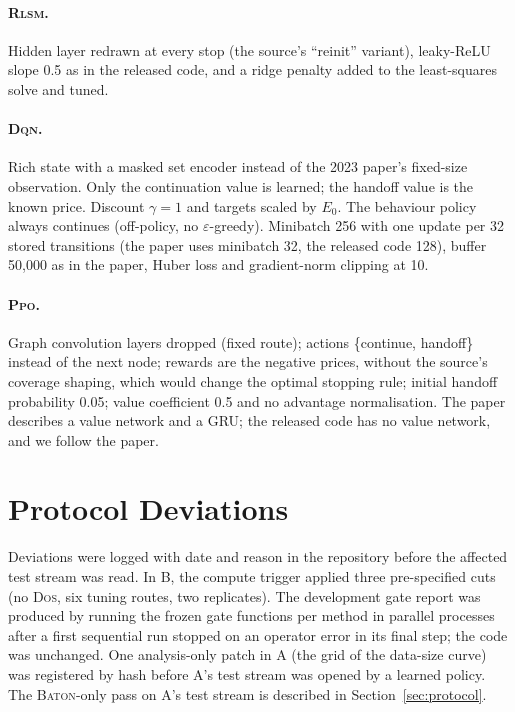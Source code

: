 \documentclass[trsc,dblanonrev]{informs4}
\newcommand{\Baton}{\textsc{Baton}}
\newcommand{\Rlsm}{\textsc{Rlsm}}
\newcommand{\Dqn}{\textsc{Dqn}}
\newcommand{\Ppo}{\textsc{Ppo}}
\newcommand{\Dos}{\textsc{Dos}}
\begin{document}
\begin{APPENDICES}
\paragraph{\Rlsm{}.} Hidden layer redrawn at every stop (the source's
``reinit'' variant), leaky-ReLU slope 0.5 as in the released code, and a ridge
penalty added to the least-squares solve and tuned.

\paragraph{\Dqn{}.} Rich state with a masked set encoder instead of the 2023
paper's fixed-size observation. Only the continuation value is learned; the
handoff value is the known price. Discount $\gamma = 1$ and targets scaled by
$E_0$. The behaviour policy always continues (off-policy, no
$\varepsilon$-greedy). Minibatch 256 with one update per 32 stored
transitions (the paper uses minibatch 32, the released code 128), buffer
50{,}000 as in the paper, Huber loss and gradient-norm clipping at 10.

\paragraph{\Ppo{}.} Graph convolution layers dropped (fixed route); actions
\{continue, handoff\} instead of the next node; rewards are the negative
prices, without the source's coverage shaping, which would change the optimal
stopping rule; initial handoff probability 0.05; value coefficient 0.5 and no
advantage normalisation. The paper describes a value network and a GRU; the
released code has no value network, and we follow the paper.

\section{Protocol Deviations}\label{app:dev}

Deviations were logged with date and reason in the repository before the
affected test stream was read. In B, the compute trigger applied three
pre-specified cuts (no \Dos{}, six tuning routes, two replicates). The
development gate report was produced by running the frozen gate functions per
method in parallel processes after a first sequential run stopped on an
operator error in its final step; the code was unchanged. One analysis-only
patch in A (the grid of the data-size curve) was registered by hash before A's
test stream was opened by a learned policy. The \Baton{}-only pass on A's test
stream is described in Section~\ref{sec:protocol}.

\end{APPENDICES}
\end{document}
